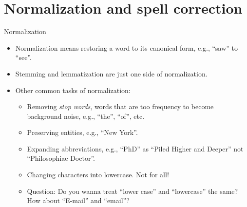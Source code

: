 \documentclass[11pt]{beamer}
\begin{document}
\section{Normalization and spell correction}

\begin{frame}{Normalization} 
\begin{itemize}[<+->]
 \item Normalization means restoring a word to its canonical form, e.g., ``saw'' to ``see''. 
 \item Stemming and lemmatization are just one side of normalization. 
 \item Other common tasks of normalization:
 \begin{itemize}
  \item Removing \textit{stop words}, words that are too frequency to become background noise, e.g., ``the'', ``of'', etc. 
  \item Preserving entities, e.g., ``New York''. 
  \item Expanding abbreviations, e.g., ``PhD'' as ``Piled Higher and Deeper'' not ``Philosophiae Doctor''. 
  \item Changing characters into lowercase. Not for all! 
  \item Question: Do you wanna treat ``lower case'' and ``lowercase'' the same? How about ``E-mail'' and ``email''? 
 \end{itemize}
\end{itemize}
\end{frame}
\end{document}
